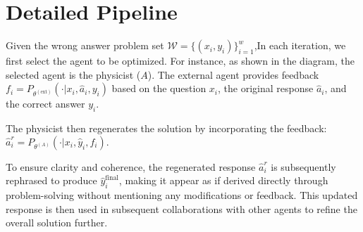 \appendix
\section{Detailed Pipeline}
\label{ap:pipeline}

Given the wrong answer problem set $\mathcal{W} = \{(x_i, y_i)\}_{i=1}^w$,In each iteration, we first select the agent to be optimized. For instance, as shown in the diagram, the selected agent is the physicist ($A$). The external agent provides feedback 
$
f_i = P_{\theta^{(\text{ext})}}(\cdot | x_i, \hat{a}_i, y_i)
$ 
based on the question $x_i$, the original response $\hat{a}_i$, and the correct answer $y_i$.

The physicist then regenerates the solution by incorporating the feedback:  
$
\hat{a}_i^{r} = P_{\theta^{(A)}}(\cdot | x_i, \hat{y}_i, f_i).
$  

To ensure clarity and coherence, the regenerated response $\hat{a}_i^{r}$ is subsequently rephrased to produce $\hat{y}_i^{\text{final}}$, making it appear as if derived directly through problem-solving without mentioning any modifications or feedback. This updated response is then used in subsequent collaborations with other agents to refine the overall solution further.

